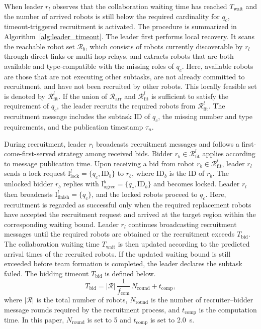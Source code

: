 \documentclass[lettersize,journal]{IEEEtran}
\begin{document}
When leader $r_l$ observes that the collaboration waiting time has reached $T_{\mathrm{wait}}$ and the number of arrived robots is still below the required cardinality for $q_c$, timeout-triggered recruitment is activated. The procedure is summarized in Algorithm~\ref{alg:leader_timeout}. The leader first performs local recovery. It scans the reachable robot set $\mathcal{R}_b$, which consists of robots currently discoverable by $r_l$ through direct links or multi-hop relays, and extracts robots that are both available and type-compatible with the missing roles of $q_c$. Here, available robots are those that are not executing other subtasks, are not already committed to recruitment, and have not been recruited by other robots. This locally feasible set is denoted by $\mathcal{R}_{\mathrm{fit}}^{l}$. If the union of $\mathcal{R}_{\mathrm{arr}}$ and $\mathcal{R}_{\mathrm{fit}}^{l}$ is sufficient to satisfy the requirement of $q_c$, the leader recruits the required robots from $\mathcal{R}_{\mathrm{fit}}^{l}$. The recruitment message includes the subtask ID of $q_c$, the missing number and type requirements, and the publication timestamp $\tau_n$.

During recruitment, leader $r_l$ broadcasts recruitment messages and follows a first-come-first-served strategy among received bids. Bidder $r_b \in \mathcal{R}_{\mathrm{fit}}^{l}$ applies according to message publication time. Upon receiving a bid from robot $r_b \in \mathcal{R}_{\mathrm{fit}}^{l}$, leader $r_l$ sends a lock request $\mathrm{I}_{\mathrm{lock}}^l = \{q_c, \mathrm{ID}_b\}$ to $r_b$, where $\mathrm{ID}_b$ is the ID of $r_b$. The unlocked bidder $r_b$ replies with $\mathrm{I}_{\mathrm{agree}}^b = \{q_c, \mathrm{ID}_b\}$ and becomes locked. Leader $r_l$ then broadcasts $\mathrm{I}_{\mathrm{finish}}^l = \{q_c\}$, and the locked robots proceed to $q_c$. Here, recruitment is regarded as successful only when the required replacement robots have accepted the recruitment request and arrived at the target region within the corresponding waiting bound. Leader $r_l$ continues broadcasting recruitment messages until the required robots are obtained or the recruitment exceeds $T_\mathrm{bid}$. The collaboration waiting time $T_{\mathrm{wait}}$ is then updated according to the predicted arrival times of the recruited robots. If the updated waiting bound is still exceeded before team formation is completed, the leader declares the subtask failed. The bidding timeout $T_{\mathrm{bid}}$ is defined below.
\begin{equation}
T_{\mathrm{bid}} = |\mathcal{R}|\,\frac{1}{f_{\mathrm{com}}}\,N_{\mathrm{round}} + t_{\mathrm{comp}},
\end{equation}
where $|\mathcal{R}|$ is the total number of robots, $N_{\mathrm{round}}$ is the number of recruiter--bidder message rounds required by the recruitment process, and $t_{\mathrm{comp}}$ is the computation time. In this paper, $N_{\mathrm{round}}$ is set to 5 and $t_{\mathrm{comp}}$ is set to 2.0~s.
\end{document}
